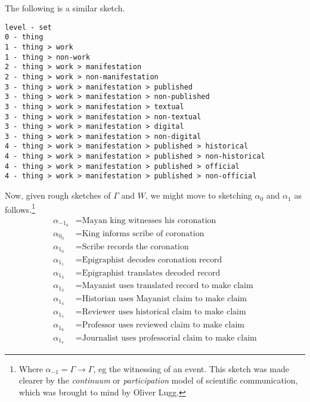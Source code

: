 \documentclass{amsart}%
\newcommand{\mention}[1]{\textit{#1}}%
\theoremstyle{plain}
\theoremstyle{definition}
\theoremstyle{remark}
\theoremstyle{definition}
\theoremstyle{remark}
\begin{document}
The following is a similar sketch.
\begin{verbatim}
level - set
0 - thing
1 - thing > work
1 - thing > non-work
2 - thing > work > manifestation
2 - thing > work > non-manifestation
3 - thing > work > manifestation > published
3 - thing > work > manifestation > non-published
3 - thing > work > manifestation > textual
3 - thing > work > manifestation > non-textual
3 - thing > work > manifestation > digital
3 - thing > work > manifestation > non-digital
4 - thing > work > manifestation > published > historical
4 - thing > work > manifestation > published > non-historical
4 - thing > work > manifestation > published > official
4 - thing > work > manifestation > published > non-official
\end{verbatim}

Now, given rough sketches of \(\Gamma\) and \(W\), we might move to sketching \(\alpha_0\) and \(\alpha_1\) as follows.\footnote{Where \(\alpha_{-1} = \Gamma\to\Gamma\), eg the witnessing of an event. %
%
%
This sketch was made clearer by the \mention{continuum} or \mention{participation} model of scientific communication, which was brought to mind by Oliver Lugg.%
%
}
\begin{align*}
\alpha_{-1_0} &= \text{Mayan king witnesses his coronation} \\%
\alpha_{0_0} &= \text{King informs scribe of coronation} \\%
\alpha_{1_0} &= \text{Scribe records the coronation}\\%
\alpha_{1_1} &= \text{Epigraphist decodes coronation record}\\%
\alpha_{1_2} &= \text{Epigraphist translates decoded record}\\%
\alpha_{1_3} &= \text{Mayanist uses translated record to make claim}\\%
\alpha_{1_4} &= \text{Historian uses Mayanist claim to make claim}\\%
\alpha_{1_5} &= \text{Reviewer uses historical claim to make claim}\\%
\alpha_{1_6} &= \text{Professor uses reviewed claim to make claim}\\
\alpha_{1_7} &= \text{Journalist uses professorial claim to make claim}
\end{align*}
\end{document}
